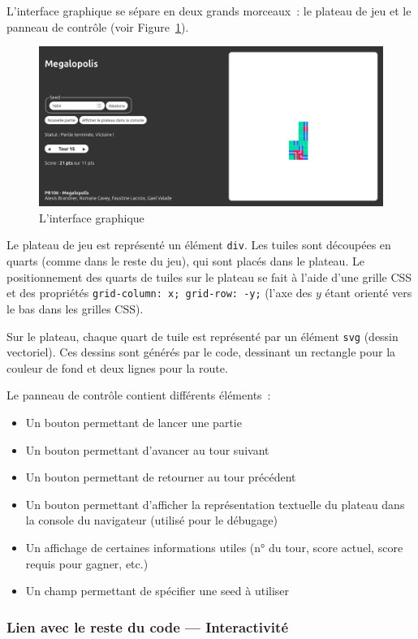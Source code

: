 L'interface graphique se sépare en deux grands morceaux~: le plateau de jeu et le panneau de contrôle (voir Figure~\ref{fig:web_gui}).

\begin{figure}[h]
    \centering
    \includegraphics[width=0.75\linewidth]{images/Affichage/web-gui-v2.png}
    \caption{L'interface graphique}
    \label{fig:web_gui}
\end{figure}

Le plateau de jeu est représenté un élément \texttt{div}. Les tuiles sont découpées en quarts (comme dans le reste du jeu), qui sont placés dans le plateau. Le positionnement des quarts de tuiles sur le plateau se fait à l'aide d'une grille CSS et des propriétés \texttt{grid-column: x; grid-row: -y;} (l'axe des $y$ étant orienté vers le bas dans les grilles CSS).

Sur le plateau, chaque quart de tuile est représenté par un élément \texttt{svg} (dessin vectoriel). Ces dessins sont générés par le code, dessinant un rectangle pour la couleur de fond et deux lignes pour la route.

Le panneau de contrôle contient différents éléments~:
\begin{itemize}
    \item Un bouton permettant de lancer une partie
    \item Un bouton permettant d'avancer au tour suivant
    \item Un bouton permettant de retourner au tour précédent
    \item Un bouton permettant d'afficher la représentation textuelle du plateau dans la console du navigateur (utilisé pour le débugage)
    \item Un affichage de certaines informations utiles (n° du tour, score actuel, score requis pour gagner, etc.)
    \item Un champ permettant de spécifier une seed à utiliser
\end{itemize}

\subsubsection{Lien avec le reste du code — Interactivité}

